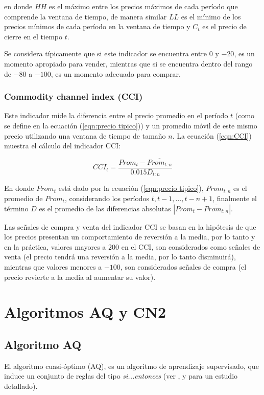 \documentclass[12pt]{report}
\theoremstyle{break}
\theoremstyle{break}
\begin{document}
en donde $HH$ es el máximo entre los precios máximos de cada período que comprende la ventana de tiempo, de manera similar $LL$ es el mínimo de los precios mínimos de cada período en la ventana de tiempo y $C_t$ es el precio de cierre en el tiempo $t$.

Se considera típicamente que si este indicador se encuentra entre $0$ y $-20$, es un momento apropiado para vender, mientras que si se encuentra dentro del rango de $-80$ a $-100$, es un momento adecuado para comprar.

\subsubsection{Commodity channel index (CCI)}
\label{subsubseccion:cci}
Este indicador mide la diferencia entre el precio promedio en el período $t$ (como se define en la ecuación (\ref{eqn:precio tipico})) y un promedio móvil de este mismo precio utilizando una ventana de tiempo de tamaño $n$. La ecuación (\ref{eqn:CCI}) muestra el cálculo del indicador CCI:

\begin{equation} \label{eqn:CCI}
CCI_t = \dfrac{ Prom_t - \overline{Prom_{t:n}} }{ 0.015 D_{t:n}}
\end{equation}

En donde $Prom_t$ está dado por la ecuación (\ref{eqn:precio tipico}), $\overline{Prom_{t:n}}$ es el promedio de $Prom_t$, considerando los períodos $t, t-1, \ldots, t-n +1$, finalmente el término $D$ es el promedio de las diferencias absolutas $\left|Prom_t - \overline{Prom_{t:n}}  \right|$.

Las señales de compra y venta del indicador CCI se basan en la hipótesis de que los precios presentan un comportamiento de reversión a la media, por lo tanto y en la práctica, valores mayores a $200$ en el CCI, son considerados como señales de venta (el precio tendrá una reversión a la media, por lo tanto disminuirá), mientras que valores menores a $-100$, son considerados señales de compra (el precio revierte a la media al aumentar su valor).

\section{Algoritmos AQ y CN2}
\label{seccion:algoritmos aq cn2}

\subsection{Algoritmo AQ}
\label{subseccion:algoritmo aq}
El algoritmo cuasi-óptimo (AQ), es un algoritmo de aprendizaje supervisado, que induce un conjunto de reglas del tipo \textit{si...entonces} (ver \cite{AQCervone2010}, \cite{AQMichalski1991} y \cite{AQWojtusiak2012} para un estudio detallado). 
\end{document}
